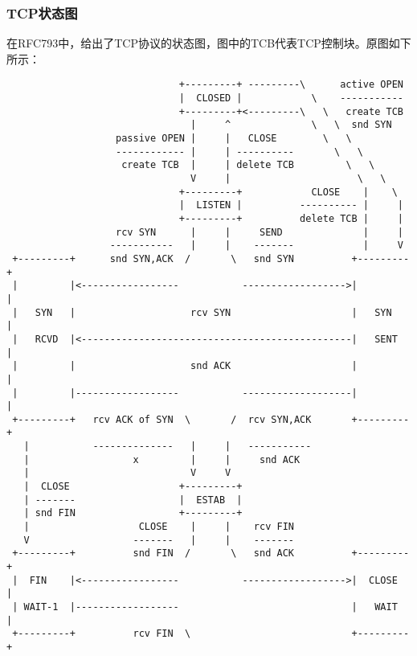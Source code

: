 \subsubsection{TCP状态图}
\label{subsubsec:tcp_state_diagram}
在RFC793中，给出了TCP协议的状态图，图中的TCB代表TCP控制块。原图如下所示：
\begin{verbatim}
                              +---------+ ---------\      active OPEN  
                              |  CLOSED |            \    -----------  
                              +---------+<---------\   \   create TCB  
                                |     ^              \   \  snd SYN    
                   passive OPEN |     |   CLOSE        \   \           
                   ------------ |     | ----------       \   \         
                    create TCB  |     | delete TCB         \   \       
                                V     |                      \   \     
                              +---------+            CLOSE    |    \   
                              |  LISTEN |          ---------- |     |  
                              +---------+          delete TCB |     |  
                   rcv SYN      |     |     SEND              |     |  
                  -----------   |     |    -------            |     V  
 +---------+      snd SYN,ACK  /       \   snd SYN          +---------+
 |         |<-----------------           ------------------>|         |
 |   SYN   |                    rcv SYN                     |   SYN   |
 |   RCVD  |<-----------------------------------------------|   SENT  |
 |         |                    snd ACK                     |         |
 |         |------------------           -------------------|         |
 +---------+   rcv ACK of SYN  \       /  rcv SYN,ACK       +---------+
   |           --------------   |     |   -----------                  
   |                  x         |     |     snd ACK                    
   |                            V     V                                
   |  CLOSE                   +---------+                              
   | -------                  |  ESTAB  |                              
   | snd FIN                  +---------+                              
   |                   CLOSE    |     |    rcv FIN                     
   V                  -------   |     |    -------                     
 +---------+          snd FIN  /       \   snd ACK          +---------+
 |  FIN    |<-----------------           ------------------>|  CLOSE  |
 | WAIT-1  |------------------                              |   WAIT  |
 +---------+          rcv FIN  \                            +---------+

\end{verbatim}

